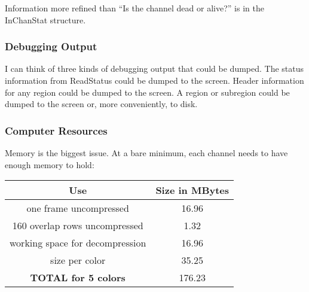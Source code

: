 Information more refined than ``Is the channel dead or alive?'' is 
in the InChanStat structure.

\subsubsection{Debugging Output}

I can think of three kinds of debugging output that could be dumped.
The status information from ReadStatus could be dumped to the screen.
Header information for any region could be dumped to the screen.
A region or subregion could be dumped to the screen or, more conveniently,
to disk.  

\subsubsection{Computer Resources}

Memory is the biggest issue.  At a bare minimum, each channel needs
to have enough memory to hold:
\vskip 0.5in
\begin{tabular}{|c|c|}
\hline
\hline
{\bf Use}			& {\bf Size in MBytes}	\\
\hline
one frame uncompressed		& 16.96		\\
160 overlap rows uncompressed	& 1.32		\\
working space for decompression & 16.96		\\
\hline
size per color			& 35.25		\\
\hline
{\bf TOTAL for 5 colors}	& 176.23	\\
\hline
\hline
\end{tabular}

